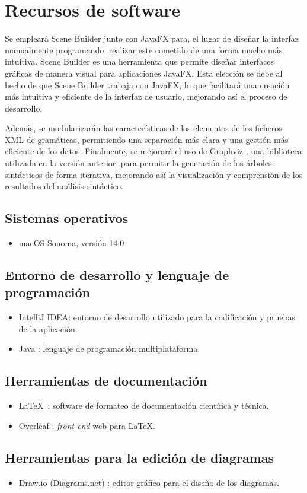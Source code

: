 \section{Recursos de software}
Se empleará Scene Builder \cite{scenebuilder} junto con JavaFX \cite{javafx} para, el lugar de diseñar la interfaz manualmente programando, realizar este cometido de una forma mucho más intuitiva. Scene Builder es una herramienta que permite diseñar interfaces gráficas de manera visual para aplicaciones JavaFX. Esta elección se debe al hecho de que Scene Builder trabaja con JavaFX, lo que facilitará una creación más intuitiva y eficiente de la interfaz de usuario, mejorando así el proceso de desarrollo.

Además, se modularizarán las características de los elementos de los ficheros XML de gramáticas, permitiendo una separación más clara y una gestión más eficiente de los datos. Finalmente, se mejorará el uso de Graphviz \cite{graphviz}, una biblioteca utilizada en la versión anterior, para permitir la generación de los árboles sintácticos de forma iterativa, mejorando así la visualización y comprensión de los resultados del análisis sintáctico.

 \subsection{Sistemas operativos}
 \begin{itemize}
      \item macOS Sonoma, versión 14.0
  \end{itemize}

 
  \subsection{Entorno de desarrollo y lenguaje de programación}
  \begin{itemize}
      \item IntelliJ IDEA\cite{intellij}: entorno de desarrollo utilizado para la codificación y pruebas de la aplicación.
      \item Java \cite{java}: lenguaje de programación multiplataforma.
  \end{itemize}

 \subsection{Herramientas de documentación}
  \begin{itemize}
      \item \LaTeX \ \cite{latex}: software de formateo de documentación científica y técnica.
      \item Overleaf \cite{overleaf}: \textit{front-end} web para \LaTeX.
  \end{itemize}

  \subsection{Herramientas para la edición de diagramas}
  \begin{itemize}
      \item Draw.io (Diagrams.net) \cite{drawio}: editor gráfico para el diseño de los diagramas.
  \end{itemize}
